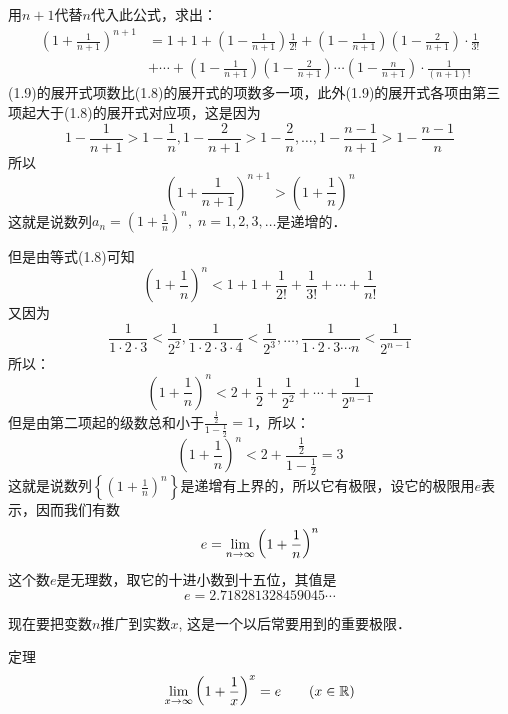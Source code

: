 用$n+1$代替$n$代入此公式，求出：
\begin{equation}
\begin{split}
    \left(1+\frac{1}{n+1}\right)^{n+1}&=1+1+\left(1-\frac{1}{n+1}\right)\frac{1}{2!}+ \left(1-\frac{1}{n+1}\right)\left(1-\frac{2}{n+1}\right)\cdot\frac{1}{3!}\\
    &+\cdots+ \left(1-\frac{1}{n+1}\right) \left(1-\frac{2}{n+1}\right)\cdots\left(1-\frac{n}{n+1}\right)\cdot\frac{1}{(n+1)!}  
\end{split}
\end{equation}
(1.9)的展开式项数比(1.8)的展开式的项数多一项，此外(1.9)的展开式各项由第三项起大于(1.8)的展开式对应项，这是因为
\[1-\frac{1}{n+1}>1-\frac{1}{n},1-\frac{2}{n+1}>1-\frac{2}{n},\ldots, 1-\frac{n-1}{n+1}>1-\frac{n-1}{n}\]
所以
\[\left(1+\frac{1}{n+1}\right)^{n+1}>\left(1+\frac{1}{n}\right)^n\]
这就是说数列$a_n=\left(1+\frac{1}{n}\right)^n,\; n=1,2,3,\ldots$是递增的．

但是由等式(1.8)可知
\[\left(1+\frac{1}{n}\right)^n<1+1+\frac{1}{2!}+\frac{1}{3!}+\cdots+\frac{1}{n!}\]
又因为
\[\frac{1}{1\cdot 2\cdot 3}<\frac{1}{2^2},\frac{1}{1\cdot 2\cdot 3\cdot 4}<\frac{1}{2^3},\ldots,\frac{1}{1\cdot 2\cdot 3\cdots n}<\frac{1}{2^{n-1}}\]
所以：
\[\left(1+\frac{1}{n}\right)^n<2+\frac{1}{2}+\frac{1}{2^2}+\cdots+\frac{1}{2^{n-1}}\]
但是由第二项起的级数总和小于$\frac{\tfrac{1}{2}}{1-\tfrac{1}{2}}=1$，所以：
\[\left(1+\frac{1}{n}\right)^n<2+\frac{\frac{1}{2}}{1-\frac{1}{2}}=3\]
这就是说数列$\left\{\left(1+\frac{1}{n}\right)^n\right\}$是递增有上界的，所以它有极限，设它的极限用$e$表示，因而我们有数
\[e=\displaystyle\lim_{n\to \infty} \left(1+\dfrac{1}{n}\right)^n\]
这个数$e$是无理数，取它的十进小数到十五位，其值是
\[e=2.718281328459045\cdots\]

现在要把变数$n$推广到实数$x$, 这是一个以后常要用到的重要极限．

\begin{blk}{定理}
\[\displaystyle\lim_{x\to \infty} \left(1+\dfrac{1}{x}\right)^x=e\qquad (x\in\mathbb{R})\] 
\end{blk}

